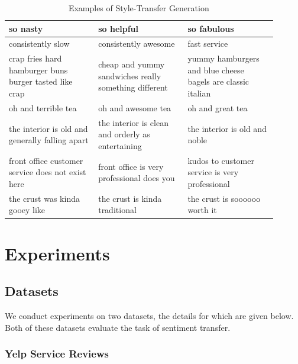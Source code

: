 \documentclass[11pt,a4paper]{article}
\begin{document}
\begin{table}[ht]
\begin{tabular}{| p{0.3\linewidth} | p{0.3\linewidth} | p{0.3\linewidth} |}
		\hline
		\hline
		so nasty                                               & so helpful                                                     & so fabulous                                                 \\
		\hline
		consistently slow                                      & consistently awesome                                           & fast service                                                \\
		\hline
		crap fries hard hamburger buns burger tasted like crap & cheap and yummy sandwiches really something different          & yummy hamburgers and blue cheese bagels are classic italian \\
		\hline
		oh and terrible tea                                    & oh and awesome tea                                             & oh and great tea                                            \\
		\hline
		the interior is old and generally falling apart        & the interior is clean and orderly as entertaining              & the interior is old and noble                               \\
		\hline
		front office customer service does not exist here      & front office is very professional does you                     & kudos to customer service is very professional              \\
		\hline
		the crust was kinda gooey like                         & the crust is kinda traditional                                 & the crust is soooooo worth it                               \\
		\hline
	\end{tabular}
	\caption{Examples of Style-Transfer Generation}
	\label{tab:transfer-samples}
\end{table}

\section{Experiments}

\subsection{Datasets}

We conduct experiments on two datasets, the details for which are given below. Both of these datasets evaluate the task of sentiment transfer.

\subsubsection{Yelp Service Reviews}
\end{document}

